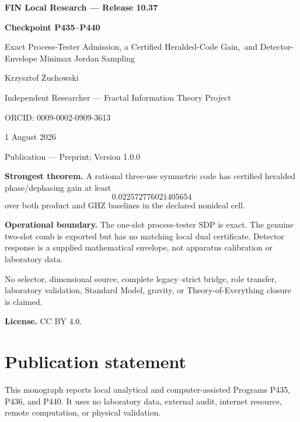 \documentclass[11pt,a4paper,openany]{report}
\begin{document}
\hypersetup{pageanchor=false}
\begin{titlepage}
\centering
\vspace*{8mm}
{\Large\bfseries FIN Local Research --- Release 10.37\par}
\vspace{10mm}
{\Huge\bfseries Checkpoint P435--P440\par}
\vspace{6mm}
{\Large Exact Process-Tester Admission, a Certified Heralded-Code Gain,\
and Detector-Envelope Minimax Jordan Sampling\par}
\vspace{15mm}
{\Large Krzysztof \.Zuchowski\par}
\vspace{2mm}
{\normalsize Independent Researcher --- Fractal Information Theory Project\par}
\vspace{2mm}
{\normalsize ORCID: 0009-0002-0909-3613\par}
\vspace{8mm}
{\large 1 August 2026\par}
{\normalsize Publication --- Preprint; Version 1.0.0\par}
\vfill
\begin{minipage}{0.92\textwidth}
\small
\textbf{Strongest theorem.}
A rational three-use symmetric code has certified heralded phase/dephasing
gain at least
\[
0.022572776021405654
\]
over both product and GHZ baselines in the declared nonideal cell.

\medskip
\textbf{Operational boundary.}
The one-slot process-tester SDP is exact.  The genuine two-slot comb is
exported but has no matching local dual certificate.  Detector response is a
supplied mathematical envelope, not apparatus calibration or laboratory data.

\medskip
No selector, dimensional source, complete legacy--strict bridge, role
transfer, laboratory validation, Standard Model, gravity, or
Theory-of-Everything closure is claimed.

\medskip
\textbf{License.} CC BY 4.0.
\end{minipage}
\vfill
\end{titlepage}
\hypersetup{pageanchor=true}
\chapter*{Publication statement}
This monograph reports local analytical and computer-assisted Programs P435,
P436, and P440.  It uses no laboratory data, external audit, internet
resource, remote computation, or physical validation.
\end{document}
